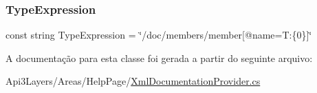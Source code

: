 \subsubsection{\texorpdfstring{Type\+Expression}{TypeExpression}}
{\footnotesize\ttfamily const string Type\+Expression = \char`\"{}/doc/members/member\mbox{[}@name=\textquotesingle{}T\+:\{0\}\textquotesingle{}\mbox{]}\char`\"{}\hspace{0.3cm}{\ttfamily [private]}}



A documentação para esta classe foi gerada a partir do seguinte arquivo\+:\begin{DoxyCompactItemize}
\item 
Api3\+Layers/\+Areas/\+Help\+Page/\hyperlink{XmlDocumentationProvider_8cs}{Xml\+Documentation\+Provider.\+cs}\end{DoxyCompactItemize}

